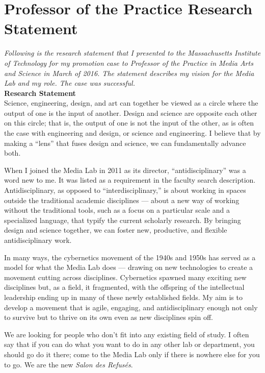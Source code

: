
\chapter{Professor of the Practice Research Statement}
\label{ch:researchstatement}


\emph{Following is the research statement that I presented to the Massachusetts Institute of Technology for my promotion case to Professor of the Practice in Media Arts and Science in March of 2016. The statement describes my vision for the Media Lab and my role. The case was successful.} \\

\textbf{Research Statement} \\

Science, engineering, design, and art can together be viewed as a circle where the output of one is the input of another. Design and science are opposite each other on this circle; that is, the output of one is not the input of the other, as is often the case with engineering and design, or science and engineering. I believe that by making a ``lens'' that fuses design and science, we can fundamentally advance both. 

When I joined the Media Lab in 2011 as its director, ``antidisciplinary'' was a word new to me. It was listed as a requirement in the faculty search description. Antidisciplinary, as opposed to ``interdisciplinary,'' is about working in spaces outside the traditional academic disciplines --- about a new way of working without the traditional tools, such as a focus on a particular scale and a specialized language, that typify the current scholarly research. By bringing design and science together, we can foster new, productive, and flexible antidisciplinary work. 

In many ways, the cybernetics movement of the 1940s and 1950s has served as a model for what the Media Lab does --- drawing on new technologies to create a movement cutting across disciplines. Cybernetics spawned many exciting new disciplines but, as a field, it fragmented, with the offspring of the intellectual leadership ending up in many of these newly established fields. My aim is to develop a movement that is agile, engaging, and antidisciplinary enough not only to survive but to thrive on its own even as new disciplines spin off.

We are looking for people who don't fit into any existing field of study. I often say that if you can do what you want to do in any other lab or department, you should go do it there; come to the Media Lab only if there is nowhere else for you to go. We are the new \textit{Salon des Refusés}.

